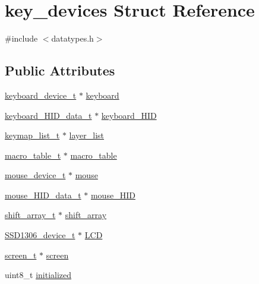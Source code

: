 \hypertarget{structkey__devices}{}\section{key\+\_\+devices Struct Reference}
\label{structkey__devices}


{\ttfamily \#include $<$datatypes.\+h$>$}

\subsection*{Public Attributes}
\begin{DoxyCompactItemize}
\item 
\hyperlink{datatypes_8h_ad5787d8aae284c464e53e68876e82918}{keyboard\+\_\+device\+\_\+t} $\ast$ \hyperlink{structkey__devices_ac02e9ecf84780350f27db0549146f2a6}{keyboard}
\item 
\hyperlink{datatypes_8h_a9539035ff5404f9a5fb4c1985d2f3fcc}{keyboard\+\_\+\+H\+I\+D\+\_\+data\+\_\+t} $\ast$ \hyperlink{structkey__devices_a2989d445521451652ded8764f28d930e}{keyboard\+\_\+\+H\+ID}
\item 
\hyperlink{datatypes_8h_ac282a7a696b1d7d36df8c0f4ebce07e7}{keymap\+\_\+list\+\_\+t} $\ast$ \hyperlink{structkey__devices_afb6ce3bdf6b2aeaa8b11064dea22fb5d}{layer\+\_\+list}
\item 
\hyperlink{datatypes_8h_a3bff27935e5dc89e910e1e2e4d3f7abe}{macro\+\_\+table\+\_\+t} $\ast$ \hyperlink{structkey__devices_a9f7692e28c20c214b10d8a495d39332a}{macro\+\_\+table}
\item 
\hyperlink{datatypes_8h_a0d85f13732d58fd4ceda707f96f9e6cc}{mouse\+\_\+device\+\_\+t} $\ast$ \hyperlink{structkey__devices_acc3c9006c806b62f7f84836bd38bfbd7}{mouse}
\item 
\hyperlink{datatypes_8h_ae33b283ee7c4c33b95f8c0d26001d642}{mouse\+\_\+\+H\+I\+D\+\_\+data\+\_\+t} $\ast$ \hyperlink{structkey__devices_ae1d2b233c86909a36b4010241056d498}{mouse\+\_\+\+H\+ID}
\item 
\hyperlink{datatypes_8h_adb530ee69b7a28ad91cf00a7c665a2f5}{shift\+\_\+array\+\_\+t} $\ast$ \hyperlink{structkey__devices_a2d89c37a95b62f18c39802dcd775849a}{shift\+\_\+array}
\item 
\hyperlink{datatypes_8h_afa3700e77990b75b3fcc954070aa90fe}{S\+S\+D1306\+\_\+device\+\_\+t} $\ast$ \hyperlink{structkey__devices_adef22ef174a01f21e4b51284247480b2}{L\+CD}
\item 
\hyperlink{datatypes_8h_a2b884fb4031189ae0bf89d344e558973}{screen\+\_\+t} $\ast$ \hyperlink{structkey__devices_aa7d66258cb8699504a5b7b5ca79312a2}{screen}
\item 
uint8\+\_\+t \hyperlink{structkey__devices_aa231e29163c11607a75536f9e7bed876}{initialized}
\end{DoxyCompactItemize}



